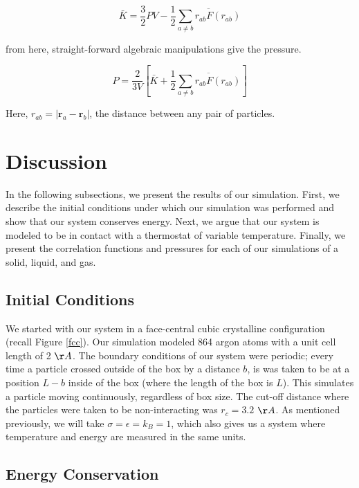 \documentclass{article}
\begin{document}
\begin{multicols}{2}
\begin{equation}
\bar{K} = \frac{3}{2} PV - \frac{1}{2} \overline{\sum \limits _{a \ne b} r_{ab} F(r_{ab})}
\end{equation}

\noindent from here, straight-forward algebraic manipulations give the pressure.

\begin{equation}
P = \frac{2}{3V} \left [ \bar{K} + \frac{1}{2} \overline{\sum \limits _{a\ne b} r_{ab} F(r_{ab})} \right ]
\end{equation}

\noindent Here, $r_{ab} = |\textbf{r}_a - \textbf{r}_b|$, the distance between any pair of particles.

\section{Discussion}
\label{disc}

In the following subsections, we present the results of our simulation.  First, we describe the initial conditions under which our simulation was performed and show that our system conserves energy.  Next, we argue that our system is modeled to be in contact with a thermostat of variable temperature.  Finally, we present the correlation functions and pressures for each of our simulations of a solid, liquid, and gas.

\subsection{Initial Conditions}

We started with our system in a face-central cubic crystalline configuration (recall Figure \ref{fcc}).  Our simulation modeled  864 argon atoms with a unit cell length of 2 $\AA$.  The boundary conditions of our system were periodic; every time a particle crossed outside of the box by a distance $b$, is was taken to be at a position $L-b$ inside of the box (where the length of the box is $L$).  This simulates a particle moving continuously, regardless of box size.  The cut-off distance where the particles were taken to be non-interacting was $r_c = 3.2$ $\AA$.  As mentioned previously, we will take $\sigma=\epsilon=k_B=1$, which also gives us a system where temperature and energy are measured in the same units.  

\subsection{Energy Conservation}


\end{multicols}
\end{document}
